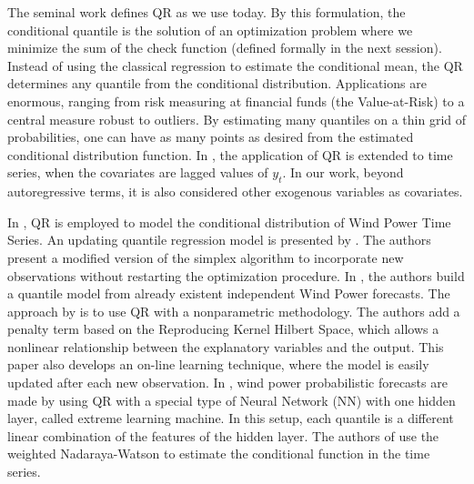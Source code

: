 %



The seminal work \cite{koenker1978regression} defines QR as we use today. By this formulation, the conditional quantile is the solution of an optimization problem where we minimize the sum of the check function (defined formally in the next session). Instead of using the classical regression to estimate the conditional mean, the QR determines any quantile from the conditional distribution. Applications are enormous, ranging from risk measuring at financial funds (the Value-at-Risk) to a central measure robust to outliers.
By estimating many quantiles on a thin grid of probabilities, one can have as many points as desired from the estimated conditional distribution function. 
In \cite{koenker_quantile_2006}, the application of QR is extended to time series, when the covariates are lagged values of $y_t$.  
In our work, beyond autoregressive terms, it is also considered other exogenous variables as covariates. 



In \cite{gallego2016line,moller_time-adaptive_2008,nielsen2006,bremnes_probabilistic_2004,wan_direct_2017}, QR is employed to model the conditional distribution of Wind Power Time Series.
An updating quantile regression model is presented by \cite{moller_time-adaptive_2008}. The authors present a modified version of the simplex algorithm to incorporate new observations without restarting the optimization procedure.
In \cite{nielsen2006}, the authors build a quantile model from already existent independent Wind Power forecasts.
The approach by \cite{gallego2016line} is to use QR with a nonparametric methodology. The authors add a penalty term based on the Reproducing Kernel Hilbert Space, which allows a nonlinear relationship between the explanatory variables and the output. This paper also develops an on-line learning technique, where the model is easily updated after each new observation.
In \cite{wan_direct_2017}, wind power probabilistic forecasts are made by using QR with a special type of Neural Network (NN) with one hidden layer, called extreme learning machine. In this setup, each quantile is a different linear combination of the features of the hidden layer.
The authors of \cite{cai_regression_2002} use the weighted Nadaraya-Watson to estimate the conditional function in the time series.

